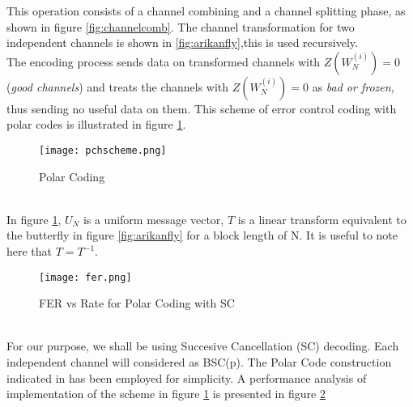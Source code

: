 \documentclass[
11pt, %
a4paper, %
oneside, %
headinclude,footinclude, %
BCOR5mm, %
]{scrartcl}
\begin{document}
This operation consists of a channel combining and a channel splitting phase, as shown in figure \ref{fig:channelcomb}. The channel transformation for two independent channels is shown in \ref{fig:arikanfly},this is used recursively. \\The encoding process sends data on transformed channels with $Z(W^{(i)}_N)=0$  (\emph{good channels}) and treats the channels with $Z(W^{(i)}_N)=0$ as \emph{bad or frozen}, thus sending no useful data on them. This scheme of error control coding with polar codes is illustrated in figure \ref{fig:pchscheme}.
\begin{figure}[h]
 \begin{center}
    \texttt{[image: pchscheme.png]}
  \end{center}
  \caption{Polar Coding}
  \label{fig:pchscheme}
\end{figure}\\
In figure \ref{fig:pchscheme}, $U_N$ is a uniform message vector, $T$ is a linear transform equivalent to the butterfly in figure \ref{fig:arikanfly} for a block length of N. It is useful to note here that $T=T^{-1}$.
\begin{figure}[h]
  \begin{center}
    \texttt{[image: fer.png]}
  \end{center}
  \caption{FER vs Rate for Polar Coding with SC}
  \label{fig:fer}
\end{figure}\\
For our purpose, we shall be using Succesive Cancellation (SC) decoding. Each independent channel will considered as BSC(p). The Polar Code construction indicated in \cite{zhang} has been employed for simplicity. A performance analysis of implementation of the scheme in figure \ref{fig:pchscheme} is presented in figure \ref{fig:fer}    
\end{document}
